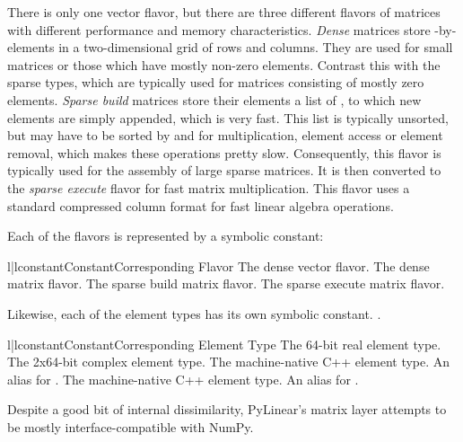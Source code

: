 There is only one vector flavor, but there are three different flavors of
matrices with different performance and memory characteristics. \emph{Dense}
matrices store -by- elements in a two-dimensional grid of 
rows and  columns. They are used for small matrices or those which have
mostly non-zero elements. Contrast this with the sparse types, which are
typically used for matrices consisting of mostly zero elements. \emph{Sparse
build} matrices store their elements a list of , to which
new elements are simply appended, which is very fast. This list is typically
unsorted, but may have to be sorted by  and  for multiplication,
element access or element removal, which makes these operations pretty slow.
Consequently, this flavor is typically used for the assembly of large sparse
matrices. It is then converted to the \emph{sparse execute} flavor for fast
matrix multiplication. This flavor uses a standard compressed column format for
fast linear algebra operations.

Each of the flavors is represented by a symbolic constant:

\begin{tableii}{l|l}{constant}{Constant}{Corresponding Flavor}
         {The dense vector flavor.}
         {The dense matrix flavor.}
         {The sparse build matrix flavor.}
         {The sparse execute matrix flavor.}
\end{tableii}

Likewise, each of the element types has its own symbolic constant.
.

\begin{tableii}{l|l}{constant}{Constant}{Corresponding Element Type}
         {The 64-bit real element type.}
         {The 2x64-bit complex element type.}
         {The machine-native C++  element type.
          An alias for .}
         {The machine-native C++  
          element type. An alias for .}
\end{tableii}

Despite a good bit of internal dissimilarity, PyLinear's matrix layer attempts
to be mostly interface-compatible with NumPy.

